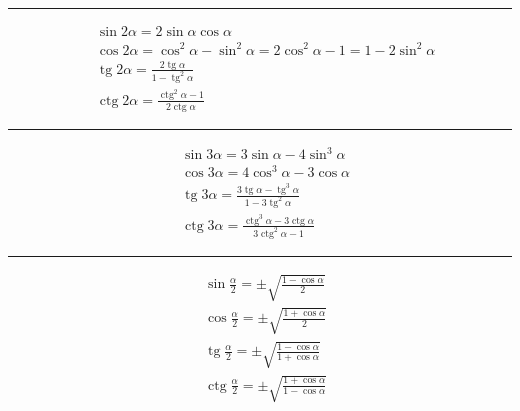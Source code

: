 \documentclass[12pt,a4paper,fleqn]{article}
\DeclareMathOperator{\tg}{tg}
\DeclareMathOperator{\ctg}{ctg}
\begin{document}
	\noindent\rule{10cm}{0.4pt}
	\begin{align*}
		&\sin2\alpha = 2\sin\alpha\cos\alpha\\
		&\cos2\alpha = \cos^2\alpha-\sin^2\alpha = 2\cos^2\alpha - 1 = 1-2\sin^2\alpha\\
		&\tg2\alpha = \frac{2\tg \alpha}{1 - \tg^2 \alpha}\\
		&\ctg2\alpha = \frac{\ctg^2\alpha-1}{2\ctg\alpha}
	\end{align*}
		
	\noindent\rule{10cm}{0.4pt}
	\begin{align*}
		&\sin3\alpha = 3\sin\alpha -4\sin^3\alpha\\
		&\cos3\alpha = 4\cos^3\alpha -3\cos\alpha\\
		&\tg3\alpha = \frac{3\tg\alpha-\tg^3\alpha}{1-3\tg^2\alpha}\\
		&\ctg3\alpha = \frac{\ctg^3\alpha - 3\ctg\alpha}{3\ctg^2\alpha-1}
	\end{align*}
	
	\noindent\rule{10cm}{0.4pt}
	\begin{align*}
		&\sin\frac{\alpha}{2} = \pm \sqrt{\frac{1-\cos\alpha}{2}}\\
		&\cos\frac{\alpha}{2} = \pm \sqrt{\frac{1+\cos\alpha}{2}}\\
		&\tg\frac{\alpha}{2} = \pm \sqrt{\frac{1-\cos\alpha}{1+\cos\alpha}}\\
		&\ctg\frac{\alpha}{2} = \pm \sqrt{\frac{1+\cos\alpha}{1-\cos\alpha}}
	\end{align*}
	
	
\end{document}
